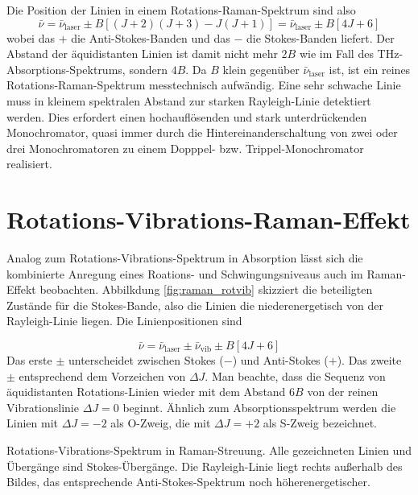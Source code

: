 Die Position der Linien in einem Rotations-Raman-Spektrum sind also
\begin{equation}
 \bar{\nu} =  \bar{\nu}_\text{laser} \pm B \left[ (J+2) (J+3) - J(J+1) \right] = 
 \bar{\nu}_\text{laser} \pm B \left[ 4J + 6 \right]
\end{equation}
wobei das $+$ die Anti-Stokes-Banden und das $-$ die Stokes-Banden liefert. Der Abstand der äquidistanten Linien ist damit nicht mehr $2B$ wie im Fall des THz-Absorptions-Spektrums, sondern $4B$. Da $B$ klein gegenüber $\bar{\nu}_\text{laser} $ ist, ist ein reines Rotations-Raman-Spektrum messtechnisch aufwändig. Eine sehr schwache Linie muss in kleinem spektralen Abstand zur starken Rayleigh-Linie detektiert werden. Dies erfordert einen hochauflösenden und stark unterdrückenden Monochromator, quasi immer durch die Hintereinanderschaltung von zwei oder drei Monochromatoren zu einem Dopppel- bzw. Trippel-Monochromator realisiert.



\section{Rotations-Vibrations-Raman-Effekt}


Analog zum Rotations-Vibrations-Spektrum in Absorption lässt sich die kombinierte Anregung eines Roations- und Schwingungsniveaus auch im Raman-Effekt beobachten. Abbilkdung \ref{fig:raman_rotvib} skizziert die beteiligten Zustände für die Stokes-Bande, also die Linien die niederenergetisch von der Rayleigh-Linie liegen. Die Linienpositionen sind 

\begin{equation}
 \bar{\nu} =  \bar{\nu}_\text{laser} \pm \bar{\nu}_\text{vib} \pm B \left[ 4J + 6 \right]
\end{equation}
Das erste $\pm$ unterscheidet zwischen Stokes ($-$) und Anti-Stokes ($+$). Das zweite $\pm$ entsprechend dem Vorzeichen von $\Delta J$. Man beachte, dass die Sequenz von äquidistanten Rotations-Linien wieder mit dem Abstand $6B$ von der reinen Vibrationslinie  $\Delta J = 0$ beginnt. Ähnlich zum Absorptionsspektrum werden die Linien mit $\Delta J =-2$ als O-Zweig, die mit 
$\Delta J =+2$ als S-Zweig bezeichnet.

\begin{marginfigure}
\caption{Rotations-Vibrations-Spektrum in Raman-Streuung. Alle gezeichneten Linien und Übergänge sind Stokes-Übergänge. Die Rayleigh-Linie liegt rechts außerhalb des Bildes, das entsprechende Anti-Stokes-Spektrum noch höherenergetischer. \label{fig:raman_rotvib}}
\end{marginfigure}
 

